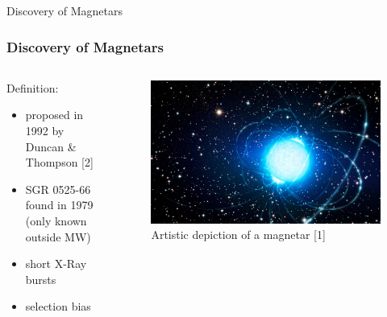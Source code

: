 \documentclass[hyperref=pdftex, presentation]{beamer}
\begin{document}
\begin{frame}{\Large Discovery of Magnetars}
\frametitle{\Large Discovery of Magnetars}

\begin{minipage}[0.2\textheight]{\textwidth}
\begin{columns}[T]
\begin{column}{0.5\textwidth}

\begin{block}{Definition:}

\begin{itemize}
 \item<2-> proposed in 1992 by Duncan \& Thompson [2]
 \item<3-> SGR 0525-66 found in 1979 (only known outside MW) %
 \item<4-> short X-Ray bursts%
 \item<5-> selection bias 
\end{itemize}
\end{block}

\end{column}
\begin{column}{0.5\textwidth}
	\begin{figure}
		\includegraphics[scale=.09]{figures/magnetar_art.jpg}
		\caption{Artistic depiction of a magnetar [1]}
	\end{figure}
\end{column}
\end{columns}
\end{minipage}

\end{frame}
\end{document}
